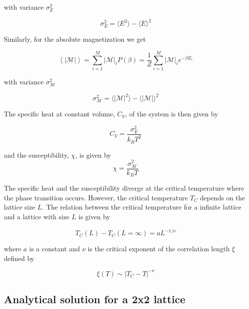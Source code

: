 \documentclass{article}
\begin{document}
\noindent with variance $\sigma_E^2$

\begin{equation}
\sigma_E^2 = \langle E^2 \rangle - \langle E \rangle^2
\label{eq:sigma_E}
\end{equation}

Similarly, for the absolute magnetization we get

\begin{equation}
\left\langle |\mathcal{M}| \right\rangle = \sum\limits_{i=1}^M |\mathcal{M}|_iP(\beta) = \frac{1}{Z} \sum\limits_{i=1}^M |\mathcal{M}|_ie^{-\beta E_i}
\label{eq:mean_M}
\end{equation}

\noindent with variance $\sigma_{\mathcal{M}}^2$

\begin{equation}
\sigma_{\mathcal{M}}^2 = \langle |\mathcal{M}|^2 \rangle - \langle |\mathcal{M}| \rangle^2
\label{eq:sigma_M}
\end{equation}

\noindent The specific heat at constant volume, $C_V$, of the system is then given by

\begin{equation}
C_V = \frac{\sigma_E^2}{k_BT^2}
\label{eq:specific_heat}
\end{equation}

\noindent and the susceptibility, $\chi$, is given by
\begin{equation}
\chi = \frac{\sigma_\mathcal{M}^2}{k_BT}
\label{eq:susceptibility}
\end{equation}

The specific heat and the susceptibility diverge at the critical temperature where the phase transition occurs. However, the critical temperature $T_C$ depends on the lattice size $L$. The relation between the critical temperature for a infinite lattice and a lattice with size $L$ is given by

\begin{equation}
T_C(L) - T_C(L=\infty) = aL^{-1/\nu}
\label{eq:crit}
\end{equation}

where $a$ is a constant and $\nu$ is the critical exponent of the correlation length $\xi$ defined by

\begin{equation}
\xi(T) \sim |T_C - T|^{-\nu} 
\end{equation}

\FloatBarrier
\subsection{Analytical solution for a 2x2 lattice}
\label{subsec:2by2}
\end{document}
